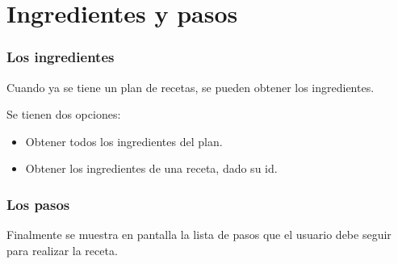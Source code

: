 \documentclass[11pt, aspectratio=169]{beamer}
\begin{document}
\section{Ingredientes y pasos}

\begin{frame}
\frametitle{Los ingredientes}

Cuando ya se tiene un plan de recetas, se pueden obtener los ingredientes.

Se tienen dos opciones:

\begin{itemize}
\item Obtener todos los ingredientes del plan.
\item Obtener los ingredientes de una receta, dado su id.
\end{itemize}

\end{frame}

\begin{frame}
\frametitle{Los pasos}

Finalmente se muestra en pantalla la lista de pasos que el usuario debe seguir para realizar la receta.

\end{frame}
\end{document}
